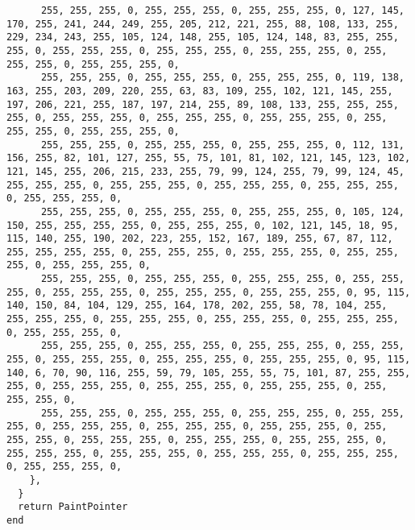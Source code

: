\documentclass{ctexart}
\begin{document}
\begin{lstlisting}
      255, 255, 255, 0, 255, 255, 255, 0, 255, 255, 255, 0, 127, 145, 170, 255, 241, 244, 249, 255, 205, 212, 221, 255, 88, 108, 133, 255, 229, 234, 243, 255, 105, 124, 148, 255, 105, 124, 148, 83, 255, 255, 255, 0, 255, 255, 255, 0, 255, 255, 255, 0, 255, 255, 255, 0, 255, 255, 255, 0, 255, 255, 255, 0, 
      255, 255, 255, 0, 255, 255, 255, 0, 255, 255, 255, 0, 119, 138, 163, 255, 203, 209, 220, 255, 63, 83, 109, 255, 102, 121, 145, 255, 197, 206, 221, 255, 187, 197, 214, 255, 89, 108, 133, 255, 255, 255, 255, 0, 255, 255, 255, 0, 255, 255, 255, 0, 255, 255, 255, 0, 255, 255, 255, 0, 255, 255, 255, 0, 
      255, 255, 255, 0, 255, 255, 255, 0, 255, 255, 255, 0, 112, 131, 156, 255, 82, 101, 127, 255, 55, 75, 101, 81, 102, 121, 145, 123, 102, 121, 145, 255, 206, 215, 233, 255, 79, 99, 124, 255, 79, 99, 124, 45, 255, 255, 255, 0, 255, 255, 255, 0, 255, 255, 255, 0, 255, 255, 255, 0, 255, 255, 255, 0, 
      255, 255, 255, 0, 255, 255, 255, 0, 255, 255, 255, 0, 105, 124, 150, 255, 255, 255, 255, 0, 255, 255, 255, 0, 102, 121, 145, 18, 95, 115, 140, 255, 190, 202, 223, 255, 152, 167, 189, 255, 67, 87, 112, 255, 255, 255, 255, 0, 255, 255, 255, 0, 255, 255, 255, 0, 255, 255, 255, 0, 255, 255, 255, 0, 
      255, 255, 255, 0, 255, 255, 255, 0, 255, 255, 255, 0, 255, 255, 255, 0, 255, 255, 255, 0, 255, 255, 255, 0, 255, 255, 255, 0, 95, 115, 140, 150, 84, 104, 129, 255, 164, 178, 202, 255, 58, 78, 104, 255, 255, 255, 255, 0, 255, 255, 255, 0, 255, 255, 255, 0, 255, 255, 255, 0, 255, 255, 255, 0, 
      255, 255, 255, 0, 255, 255, 255, 0, 255, 255, 255, 0, 255, 255, 255, 0, 255, 255, 255, 0, 255, 255, 255, 0, 255, 255, 255, 0, 95, 115, 140, 6, 70, 90, 116, 255, 59, 79, 105, 255, 55, 75, 101, 87, 255, 255, 255, 0, 255, 255, 255, 0, 255, 255, 255, 0, 255, 255, 255, 0, 255, 255, 255, 0, 
      255, 255, 255, 0, 255, 255, 255, 0, 255, 255, 255, 0, 255, 255, 255, 0, 255, 255, 255, 0, 255, 255, 255, 0, 255, 255, 255, 0, 255, 255, 255, 0, 255, 255, 255, 0, 255, 255, 255, 0, 255, 255, 255, 0, 255, 255, 255, 0, 255, 255, 255, 0, 255, 255, 255, 0, 255, 255, 255, 0, 255, 255, 255, 0, 
    },
  }
  return PaintPointer
end


\end{lstlisting}
\end{document}
